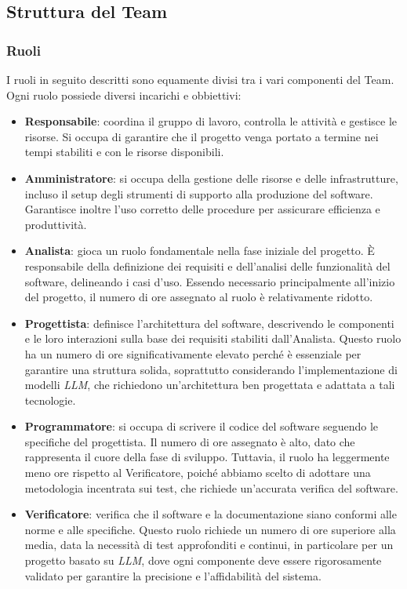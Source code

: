 \documentclass{article}
\begin{document}
    \subsection{Struttura del Team}
        \subsubsection{Ruoli}
        I ruoli in seguito descritti sono equamente divisi tra i vari componenti del Team. Ogni ruolo possiede diversi incarichi e obbiettivi:
        \begin{itemize}
            \item \textbf{Responsabile}: coordina il gruppo di lavoro, controlla le attività e gestisce le risorse. Si occupa di garantire che il progetto venga portato a termine nei tempi stabiliti e con le risorse disponibili.
            \item \textbf{Amministratore}: si occupa della gestione delle risorse e delle infrastrutture, incluso il setup degli strumenti di supporto alla produzione del software. Garantisce inoltre l’uso corretto delle procedure per assicurare efficienza e produttività.
            \item \textbf{Analista}: gioca un ruolo fondamentale nella fase iniziale del progetto. È responsabile della definizione dei requisiti e dell’analisi delle funzionalità del software, delineando i casi d'uso. Essendo necessario principalmente all'inizio del progetto, il numero di ore assegnato al ruolo è relativamente ridotto.
            \item \textbf{Progettista}: definisce l'architettura del software, descrivendo le componenti e le loro interazioni sulla base dei requisiti stabiliti dall'Analista. Questo ruolo ha un numero di ore significativamente elevato perché è essenziale per garantire una struttura solida, soprattutto considerando l’implementazione di modelli \emph{LLM}, che richiedono un'architettura ben progettata e adattata a tali tecnologie.
            \item \textbf{Programmatore}: si occupa di scrivere il codice del software seguendo le specifiche del progettista. Il numero di ore assegnato è alto, dato che rappresenta il cuore della fase di sviluppo. Tuttavia, il ruolo ha leggermente meno ore rispetto al Verificatore, poiché abbiamo scelto di adottare una metodologia incentrata sui test, che richiede un’accurata verifica del software.
            \item \textbf{Verificatore}: verifica che il software e la documentazione siano conformi alle norme e alle specifiche. Questo ruolo richiede un numero di ore superiore alla media, data la necessità di test approfonditi e continui, in particolare per un progetto basato su \emph{LLM}, dove ogni componente deve essere rigorosamente validato per garantire la precisione e l’affidabilità del sistema.
        \end{itemize}
\end{document}
